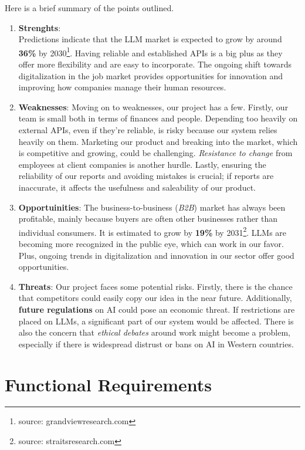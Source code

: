 \documentclass{article}
\begin{document}
Here is a brief summary of the points outlined.
\begin{enumerate}
    \item \textbf{Strenghts}:\\
Predictions indicate that the LLM market is expected to grow by around \textbf{36\%} by 2030\footnote{source: grandviewresearch.com}. Having reliable and established APIs is a big plus as they offer more flexibility and are easy to incorporate. The ongoing shift towards digitalization in the job market provides opportunities for innovation and improving how companies manage their human resources.
    \item \textbf{Weaknesses}:
Moving on to weaknesses, our project has a few. Firstly, our team is small both in terms of finances and people. Depending too heavily on external APIs, even if they're reliable, is risky because our system relies heavily on them. Marketing our product and breaking into the market, which is competitive and growing, could be challenging. \textit{Resistance to change} from employees at client companies is another hurdle. Lastly, ensuring the reliability of our reports and avoiding mistakes is crucial; if reports are inaccurate, it affects the usefulness and saleability of our product.
    \item \textbf{Opportuinities}:
The business-to-business (\textit{B2B}) market has always been profitable, mainly because buyers are often other businesses rather than individual consumers. It is estimated to grow by \textbf{19\%} by 2031\footnote{source: straitsresearch.com}. LLMs are becoming more recognized in the public eye, which can work in our favor. Plus, ongoing trends in digitalization and innovation in our sector offer good opportunities.
    \item \textbf{Threats}:
Our project faces some potential risks. Firstly, there is the chance that competitors could easily copy our idea in the near future. Additionally, \textbf{future regulations} on AI could pose an economic threat. If restrictions are placed on LLMs, a significant part of our system would be affected. There is also the concern that \textit{ethical debates} around work might become a problem, especially if there is widespread distrust or bans on AI in Western countries.
\end{enumerate}


\section{Functional Requirements}
\end{document}
